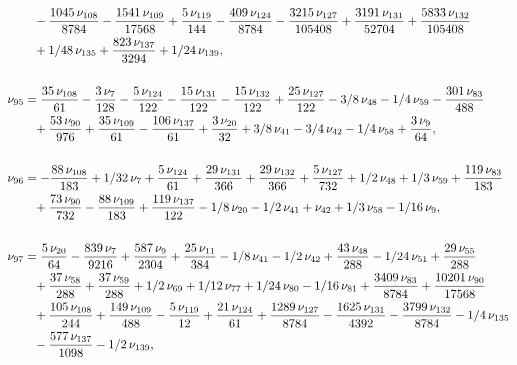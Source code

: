 \documentclass[a4paper,12pt, DIV=14, BCOR=5mm, twoside, headsepline, numbers=noenddot]{scrbook}
\begin{document}
\begin{align}
\begin{aligned}
 &\hphantom{=}-{\frac {1045\,\nu_
{{108}}}{8784}}-{\frac {1541\,\nu_{{109}}}{17568}}+{\frac {5\,\nu_{{
119}}}{144}}-{\frac {409\,\nu_{{124}}}{8784}}-{\frac {3215\,\nu_{{127}
}}{105408}}+{\frac {3191\,\nu_{{131}}}{52704}}+{\frac {5833\,\nu_{{132
}}}{105408}}\\
 &\hphantom{=}+1/48\,\nu_{{135}}+{\frac {823\,\nu_{{137}}}{3294}}+1/24\,
\nu_{{139}}, \\
\\
\nu_{{95}}&={\frac {35\,\nu_{{108}}}{61}}-{\frac {3\,\nu_{{
7}}}{128}}-{\frac {5\,\nu_{{124}}}{122}}-{\frac {15\,\nu_{{131}}}{122}
}-{\frac {15\,\nu_{{132}}}{122}}+{\frac {25\,\nu_{{127}}}{122}}-3/8\,
\nu_{{48}}-1/4\,\nu_{{59}}-{\frac {301\,\nu_{{83}}}{488}}\\
 &\hphantom{=}+{\frac {53\,
\nu_{{90}}}{976}}+{\frac {35\,\nu_{{109}}}{61}}-{\frac {106\,\nu_{{137
}}}{61}}+{\frac {3\,\nu_{{20}}}{32}}+3/8\,\nu_{{41}}-3/4\,\nu_{{42}}-1
/4\,\nu_{{58}}+{\frac {3\,\nu_{{9}}}{64}},  \\
\\
\nu_{{96}}&=-{\frac {88\,\nu_
{{108}}}{183}}+1/32\,\nu_{{7}}+{\frac {5\,\nu_{{124}}}{61}}+{\frac {29
\,\nu_{{131}}}{366}}+{\frac {29\,\nu_{{132}}}{366}}+{\frac {5\,\nu_{{
127}}}{732}}+1/2\,\nu_{{48}}+1/3\,\nu_{{59}}+{\frac {119\,\nu_{{83}}}{
183}}\\
 &\hphantom{=}+{\frac {73\,\nu_{{90}}}{732}}-{\frac {88\,\nu_{{109}}}{183}}+{
\frac {119\,\nu_{{137}}}{122}}-1/8\,\nu_{{20}}-1/2\,\nu_{{41}}+\nu_{{
42}}+1/3\,\nu_{{58}}-1/16\,\nu_{{9}}, \\
\\
\nu_{{97}}&={\frac {5\,\nu_{{20}}
}{64}}-{\frac {839\,\nu_{{7}}}{9216}}+{\frac {587\,\nu_{{9}}}{2304}}+{
\frac {25\,\nu_{{11}}}{384}}-1/8\,\nu_{{41}}-1/2\,\nu_{{42}}+{\frac {
43\,\nu_{{48}}}{288}}-1/24\,\nu_{{51}}+{\frac {29\,\nu_{{55}}}{288}}\\
 &\hphantom{=}+{
\frac {37\,\nu_{{58}}}{288}}+{\frac {37\,\nu_{{59}}}{288}}+1/2\,\nu_{{
69}}+1/12\,\nu_{{77}}+1/24\,\nu_{{80}}-1/16\,\nu_{{81}}+{\frac {3409\,
\nu_{{83}}}{8784}}+{\frac {10201\,\nu_{{90}}}{17568}}\\
 &\hphantom{=}+{\frac {105\,\nu
_{{108}}}{244}}+{\frac {149\,\nu_{{109}}}{488}}-{\frac {5\,\nu_{{119}}
}{12}}+{\frac {21\,\nu_{{124}}}{61}}+{\frac {1289\,\nu_{{127}}}{8784}}
-{\frac {1625\,\nu_{{131}}}{4392}}-{\frac {3799\,\nu_{{132}}}{8784}}-1
/4\,\nu_{{135}}\\
 &\hphantom{=}-{\frac {577\,\nu_{{137}}}{1098}}-1/2\,\nu_{{139}}, 
\end{aligned}
\end{align}
\end{document}
